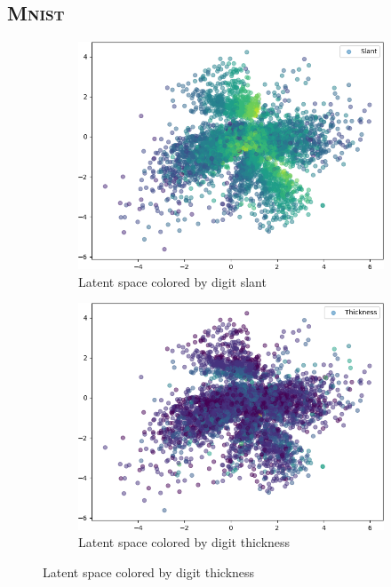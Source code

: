 \subsection{\textsc{Mnist}}
\begin{figure}[H]
    \centering
    \begin{subfigure}{.32\textwidth}
        \includegraphics[width=\textwidth]{images/latent_spaces/mnist/vae_gan/embeddings_mu_0.png}
        \caption{Latent space colored by digit slant}
    \end{subfigure}
    \hfill
    \begin{subfigure}{.32\textwidth}
        \includegraphics[width=\textwidth]{images/latent_spaces/mnist/vae_gan/embeddings_mu_1.png}
        \caption{Latent space colored by digit thickness}

\end{subfigure}
\end{figure}
